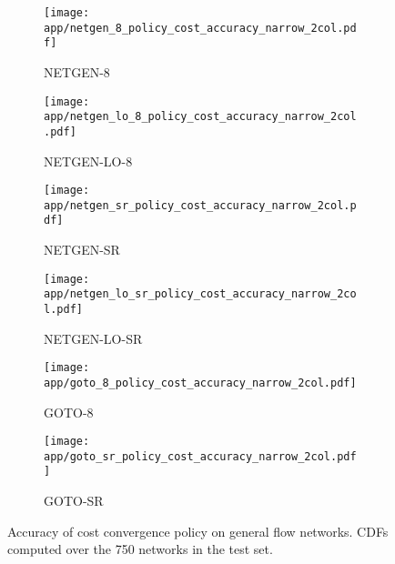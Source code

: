 \begin{figure}
    \begin{widepage}
        \begin{subfigure}[c]{0.5\textwidth}
            \texttt{[image: app/netgen\_8\_policy\_cost\_accuracy\_narrow\_2col.pdf]}
            \caption{NETGEN-8}
        \end{subfigure}
        \begin{subfigure}[c]{0.5\textwidth}
            \texttt{[image: app/netgen\_lo\_8\_policy\_cost\_accuracy\_narrow\_2col.pdf]}
            \caption{NETGEN-LO-8}
            \label{fig:app-general-cost-accuracy-cdf:netgen-lo-8}
        \end{subfigure}
        \begin{subfigure}[c]{0.5\textwidth}
            \texttt{[image: app/netgen\_sr\_policy\_cost\_accuracy\_narrow\_2col.pdf]}
            \caption{NETGEN-SR}
        \end{subfigure}
        \begin{subfigure}[c]{0.5\textwidth}
            \texttt{[image: app/netgen\_lo\_sr\_policy\_cost\_accuracy\_narrow\_2col.pdf]}
            \caption{NETGEN-LO-SR}
            \label{fig:app-general-cost-accuracy-cdf:netgen-lo-sr}
        \end{subfigure}
        \begin{subfigure}[c]{0.5\textwidth}
            \texttt{[image: app/goto\_8\_policy\_cost\_accuracy\_narrow\_2col.pdf]}
            \caption{GOTO-8}
        \end{subfigure}
        \begin{subfigure}[c]{0.5\textwidth}
            \texttt{[image: app/goto\_sr\_policy\_cost\_accuracy\_narrow\_2col.pdf]}
            \caption{GOTO-SR}
        \end{subfigure}
    \end{widepage}
    \caption[Accuracy of cost convergence policy on general flow networks]{Accuracy of cost convergence policy on general flow networks. CDFs computed over the 750 networks in the test set.}
    \label{fig:app-general-cost-accuracy-cdf}
\end{figure}

